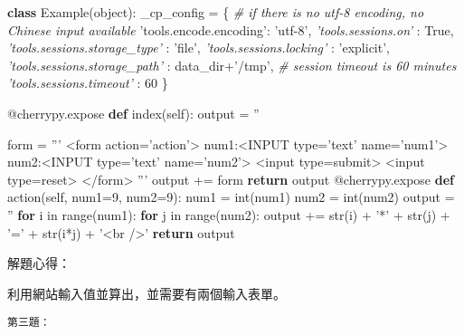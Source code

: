 \documentclass[]{article}
\newenvironment{Shaded}{}{}
\newcommand{\KeywordTok}[1]{\textcolor[rgb]{0.00,0.44,0.13}{\textbf{{#1}}}}
\newcommand{\DataTypeTok}[1]{\textcolor[rgb]{0.56,0.13,0.00}{{#1}}}
\newcommand{\DecValTok}[1]{\textcolor[rgb]{0.25,0.63,0.44}{{#1}}}
\newcommand{\StringTok}[1]{\textcolor[rgb]{0.25,0.44,0.63}{{#1}}}
\newcommand{\CommentTok}[1]{\textcolor[rgb]{0.38,0.63,0.69}{\textit{{#1}}}}
\newcommand{\OtherTok}[1]{\textcolor[rgb]{0.00,0.44,0.13}{{#1}}}
\newcommand{\NormalTok}[1]{{#1}}
\begin{document}
\begin{Shaded}
\begin{Highlighting}[]
\KeywordTok{class} \NormalTok{Example(}\DataTypeTok{object}\NormalTok{):}
\NormalTok{_cp_config = \{}
\CommentTok{# if there is no utf-8 encoding, no Chinese input available}
\StringTok{'tools.encode.encoding'}\NormalTok{: }\StringTok{'utf-8'}\NormalTok{,}
\CommentTok{'tools.sessions.on'} \NormalTok{: }\OtherTok{True}\NormalTok{,}
\CommentTok{'tools.sessions.storage_type'} \NormalTok{: }\StringTok{'file'}\NormalTok{,}
\CommentTok{'tools.sessions.locking'} \NormalTok{: }\StringTok{'explicit'}\NormalTok{,}
\CommentTok{'tools.sessions.storage_path'} \NormalTok{: data_dir+}\StringTok{'/tmp'}\NormalTok{,}
\CommentTok{# session timeout is 60 minutes}
\CommentTok{'tools.sessions.timeout'} \NormalTok{: }\DecValTok{60}
\NormalTok{\}}

\OtherTok{@cherrypy.expose}
\KeywordTok{def} \NormalTok{index(}\OtherTok{self}\NormalTok{):}
    \NormalTok{output = }\StringTok{''}

    \NormalTok{form = }\StringTok{'''}
\StringTok{    <form action='action'>}
\StringTok{    num1:<INPUT type='text' name='num1'>}
\StringTok{    num2:<INPUT type='text'  name='num2'>}
\StringTok{    <input type=submit>}
\StringTok{    <input type=reset>}
\StringTok{    </form>}
\StringTok{    '''}
    \NormalTok{output += form}
    \KeywordTok{return} \NormalTok{output}
\OtherTok{@cherrypy.expose}
\KeywordTok{def} \NormalTok{action(}\OtherTok{self}\NormalTok{, num1=}\DecValTok{9}\NormalTok{, num2=}\DecValTok{9}\NormalTok{):}
    \NormalTok{num1 = }\DataTypeTok{int}\NormalTok{(num1)}
    \NormalTok{num2 = }\DataTypeTok{int}\NormalTok{(num2)}
    \NormalTok{output = }\StringTok{''}
    \KeywordTok{for} \NormalTok{i in }\DataTypeTok{range}\NormalTok{(num1):}
        \KeywordTok{for} \NormalTok{j in }\DataTypeTok{range}\NormalTok{(num2):}
            \NormalTok{output += }\DataTypeTok{str}\NormalTok{(i) + }\StringTok{'*'} \NormalTok{+ }\DataTypeTok{str}\NormalTok{(j) + }\StringTok{'='} \NormalTok{+ }\DataTypeTok{str}\NormalTok{(i*j) + }\StringTok{'<br />'}
    \KeywordTok{return} \NormalTok{output}
\end{Highlighting}
\end{Shaded}

解題心得：

利用網站輸入值並算出，並需要有兩個輸入表單。

\begin{verbatim}
第三題：
\end{verbatim}
\end{document}

